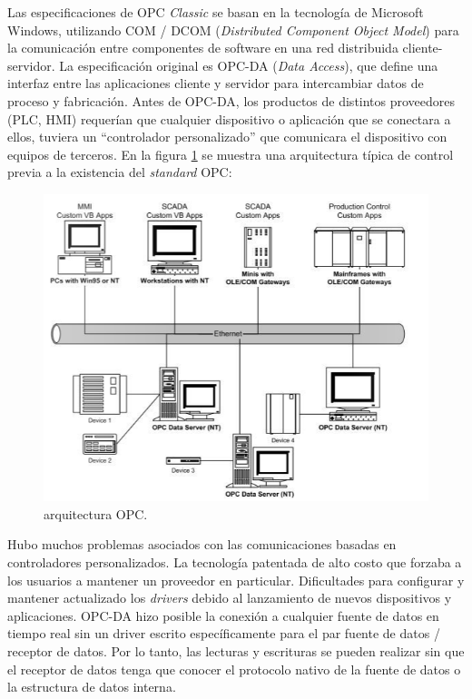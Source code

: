Las especificaciones de OPC \textit{Classic} se basan en la tecnología de Microsoft Windows, utilizando COM / DCOM (\textit{Distributed Component Object Model}) para la comunicación entre componentes de software en una red distribuida cliente-servidor. La especificación original es OPC-DA (\textit{Data Access}), que define una interfaz entre las aplicaciones cliente y servidor para intercambiar datos de proceso y fabricación. Antes de OPC-DA, los productos de distintos proveedores (PLC, HMI) requerían que cualquier dispositivo o aplicación que se conectara a ellos, tuviera un ``controlador personalizado'' que comunicara el dispositivo con equipos de terceros. En la figura \ref{fig:OPCAQ} se muestra una arquitectura típica de control previa a la existencia del \textit{standard} OPC:

\begin{figure}[htpb]
	\centering
	\includegraphics[scale=0.40]{./Figures/opc_1.png}
	\caption{arquitectura OPC\protect\footnotemark.}
	\label{fig:OPCAQ}
\end{figure}


Hubo muchos problemas asociados con las comunicaciones basadas en controladores personalizados. La tecnología patentada de alto costo que forzaba a los usuarios a mantener un proveedor en particular. Dificultades para configurar y  mantener actualizado los \textit{drivers} debido al lanzamiento de nuevos dispositivos y aplicaciones. OPC-DA hizo posible la conexión a cualquier fuente de datos en tiempo real sin un driver escrito específicamente para el par fuente de datos / receptor de datos. Por lo tanto, las lecturas y escrituras se pueden realizar sin que el receptor de datos tenga que conocer el protocolo nativo de la fuente de datos o la estructura de datos interna.\\ 


